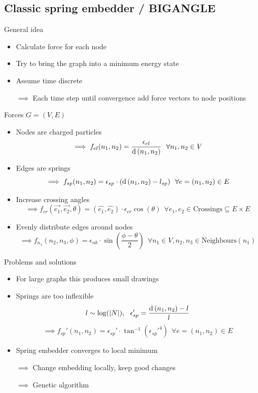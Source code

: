 \documentclass[notheorems]{beamer}
\theoremstyle{plain}
\theoremstyle{definition}
\theoremstyle{remark}
\newcommand{\dist}[1]{\ensuremath\text{d}\left(#1\right)}
\begin{document}
\subsection{Classic spring embedder / BIGANGLE}
\begin{frame}{General idea}
\begin{itemize}
\item Calculate force for each node
\item Try to bring the graph into a minimum energy state
\item Assume time discrete 
\item[$\implies$] Each time step until convergence add force vectors to node positions
\end{itemize}
\end{frame}
\begin{frame}{Forces}
$G = (V, E)$
\begin{itemize}
\item Nodes are charged particles 
$$\implies f_{el}(n_1, n_2) = \frac{\epsilon_{el}}{\dist{n_1, n_2}}~~\forall n_1, n_2\in V$$
\item Edges are springs 
$$\implies f_{sp}(n_1, n_2) = \epsilon_{sp}\cdot(\dist{n_1, n_2} - l_{sp})~~\forall e=(n_1, n_2)\in E$$
\item Increase crossing angles 
$$\implies f_{cr}(\vec{e_1}, \vec{e_2}, \theta) = (\hat{e_1}, \hat{e_2})\cdot\epsilon_{cr}\cos(\theta)~~\forall e_1, e_2\in \text{Crossings}\subseteq E\times E$$
\item Evenly distribute edges around nodes 
$$\implies f_{n_1}(n_2, n_3, \phi)=\epsilon_{nb}\cdot\sin\left(\frac{\phi-\theta}2\right)~~\forall n_1\in V, n_2, n_3\in\text{Neighbours}(n_1)$$
\end{itemize}
\end{frame}
\begin{frame}{Problems and solutions}
\begin{itemize}
\item For large graphs this produces small drawings
\item Springs are too inflexible
$$l \sim \log(|N|), ~~ \epsilon_{sp}' = \frac{\dist{n_1, n_2} - l}l$$
$$\implies f_{sp}'(n_1, n_2) = \epsilon_{sp}'\cdot\tan^{-1}\left({\epsilon_{sp}'}^4\right)~~\forall e=(n_1, n_2)\in E$$
\item Spring embedder converges to local minimum
\item[$\implies$] Change embedding locally, keep good changes
\item[$\implies$] Genetic algorithm
\end{itemize}
\end{frame}
\end{document}
